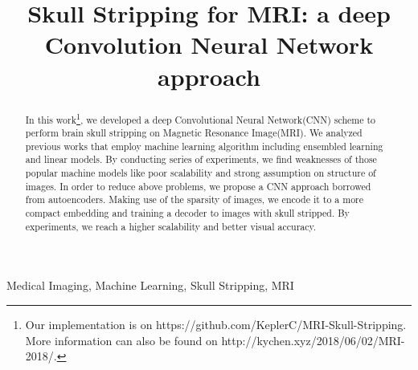 \documentclass[conference]{IEEEtran}
\begin{document}
\title{Skull Stripping for MRI: a deep Convolution Neural Network approach}

\author{
\and
{}
}

\maketitle

\begin{abstract}
In this work\footnote{Our implementation is on https://github.com/KeplerC/MRI-Skull-Stripping. More information can also be found on http://kychen.xyz/2018/06/02/MRI-2018/.}, we developed a deep Convolutional Neural Network(CNN) scheme to perform brain skull stripping on Magnetic Resonance Image(MRI). We analyzed previous works that employ machine learning algorithm including ensembled learning and linear models. By conducting series of experiments, we find weaknesses of those popular machine models like poor scalability and strong assumption on structure of images. In order to reduce above problems, we propose a CNN approach borrowed from autoencoders. Making use of the sparsity of images, we encode it to a more compact embedding and training a decoder to images with skull stripped. By experiments, we reach a higher scalability and better visual accuracy. 

\end{abstract}

\begin{IEEEkeywords}
Medical Imaging, Machine Learning, Skull Stripping, MRI
\end{IEEEkeywords}
\end{document}
